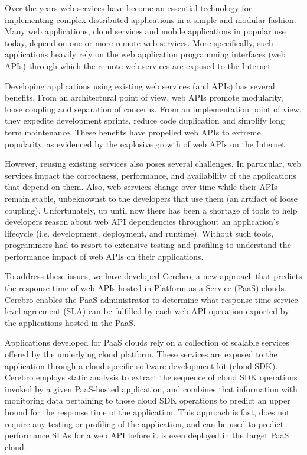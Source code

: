 Over the years web services have become an essential technology for implementing
complex distributed applications in a simple and modular fashion. Many web applications, cloud services and mobile
applications in popular use today, depend on one or more remote web services. More specifically, such
applications heavily rely on the web application programming interfaces (web APIs) through
which the remote web services are exposed to the Internet.

Developing applications using existing web services (and APIs) has several benefits. From an
architectural point of view, web APIs promote modularity, loose coupling and separation of concerns. From
an implementation point of view, they expedite development sprints, reduce code duplication and simplify
long term maintenance. These benefits have propelled web APIs to extreme popularity,
as evidenced by the explosive growth of web APIs on the Internet. 

However, reusing existing services also poses several challenges. In particular, web services
impact the correctness, performance, and availability of the
applications that depend on them. Also, web services change over time while their APIs remain 
stable, unbeknownst to the developers that use them (an artifact of loose coupling).
Unfortunately, up until now there has been a shortage of tools to help developers 
reason about web API dependencies throughout an application's 
lifecycle (i.e. development, deployment, and runtime).  Without such tools, 
programmers had to resort to extensive testing and profiling 
to understand the performance impact of web APIs on their applications.

To address these issues, we have developed Cerebro, a new approach that
predicts the response time of web APIs hosted in Platform-as-a-Service (PaaS) clouds.
Cerebro enables the PaaS administrator to determine what response time service level 
agreement (SLA) can be fulfilled by each web API operation exported by the applications
hosted in the PaaS. 

Applications developed for PaaS clouds rely on a collection of
scalable services offered by the underlying cloud platform. These services are exposed to
the application through a cloud-specific software development kit (cloud SDK). Cerebro
employs static analysis to extract the sequence of cloud SDK operations invoked by a
given PaaS-hosted application, and combines that information with monitoring
data pertaining to those cloud SDK operations to predict an upper bound for the response
time of the application. This approach is fast, does not require any testing or profiling
of the application, and can be used to predict performance SLAs for a web API before
it is even deployed in the target PaaS cloud.

